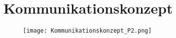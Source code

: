 \section{Kommunikationskonzept}
\begin{figure}[H]
	\centering
	\texttt{[image: Kommunikationskonzept\_P2.png]}
	\label{fig:Kommunikationskonzept}
\end{figure}

